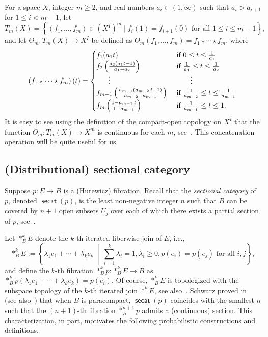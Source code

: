 \documentclass[amscd,amssymb,verbatim,10pt]{amsart}
\numberwithin{equation}{section}
\theoremstyle{plain}
\theoremstyle{definition}
\DeclareMathOperator{\secat}{{\mathsf{secat}}}
\begin{document}
For a space $X$, integer $m \ge 2$, and real numbers $a_i \in (1,\infty)$ such that $a_i > a_{i+1}$ for $1 \le i < m-1$, let
$$
T_{m}(X) = \left\{\left(f_{1}, \ldots, f_{m} \right) \in (X^I)^{m} \mid f_{i}(1) = f_{i+1}(0) \text{ for all } 1 \le i \le m-1 \right\},
$$
and let $\Theta_{m}: T_{m}(X) \to X^I$ be defined as $\Theta_{m}\left(f_{1}, \ldots, f_{m} \right) = f_{1} \star \cdots \star f_{m}$, where
$$
\left(f_{1} \star \cdots \star f_{m}\right)(t) = \begin{cases}
    f_{1}(a_{1}t) & \text{ if } 0 \le t \le \frac{1}{a_{1}} \\
    f_{2}\left(\frac{a_{2}(a_{1}t-1)}{a_{1}-a_{2}}\right) & \text{ if } \frac{1}{a_{1}} \le t \le \frac{1}{a_{2}}
    \\
    \hspace{6mm} \vdots & \hspace{8mm} \vdots 
    \\
    f_{m-1}\left(\frac{a_{m-1}(a_{m-2}\hspace{0.5mm} t-1)}{a_{m-2}-a_{m-1}}\right) & \text{ if } \frac{1}{a_{m-2}} \le t \le \frac{1}{a_{m-1}} 
    \\
    f_{m}\left(\frac{1-a_{m-1}\hspace{0.5mm} t}{1-a_{m-1}}\right) & \text{ if } \frac{1}{a_{m-1}} \le t \le 1.
\end{cases}
$$
It is easy to see using the definition of the compact-open topology on $X^I$ that the function $\Theta_{m}\colon T_m(X)\to X^m$ is continuous for each $m$, see~\cite[Lemma~2.1]{Ja1}. This concatenation operation will be quite useful for us.

\subsection{(Distributional) sectional category}\label{subsec: secat}
Suppose $p\colon E\to B$ is a (Hurewicz) fibration. Recall that the \emph{sectional category} of $p$, denoted $\secat(p)$, is the least non-negative integer $n$ such that $B$ can be covered by $n+1$ open subsets $U_j$ over each of which there exists a partial section of $p$, see~\cite{Sch}.

Let $\ast^k_BE$ denote the $k$-th iterated fiberwise join of $E$, i.e., 
\[
\ast^k_BE:=\left\{\lambda_1e_1+\cdots+\lambda_ke_k\ \middle| \ \sum_{i=1}^k\lambda_i=1,\lambda_i\ge 0, p(e_i)=p(e_j) \text{ for all }i,j \right\},
\]
and define the $k$-th fibration $\ast^k_Bp\colon \ast^k_BE\to B$ as $\ast^k_Bp(\lambda_1e_1+\cdots+\lambda_ke_k)=p(e_i)$. Of course, $\ast^k_BE$ is topologized with the subspace topology of the $k$-th iterated join $\ast^kE$, see also~\cite{CLOT}. Schwarz proved in~\cite{Sch} (see also~\cite{Jam}) that when $B$ is paracompact, $\secat(p)$ coincides with the smallest $n$ such that the $(n+1)$-th fibration $\ast^{n+1}_Bp$ admits a (continuous) section. This characterization, in part, motivates the following probabilistic constructions and definitions.
\end{document}
